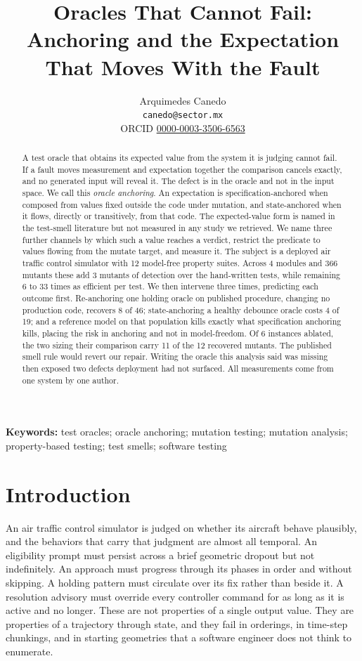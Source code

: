 \documentclass[12pt]{article}
\title{Oracles That Cannot Fail:\\
Anchoring and the Expectation That Moves With the Fault}
\author{Arquimedes Canedo\\
\texttt{canedo@sector.mx}\\
\small ORCID \href{https://orcid.org/0000-0003-3506-6563}{0000-0003-3506-6563}}
\date{}
\begin{document}
\maketitle
\vspace{-2em}

\begin{abstract}
A test oracle that obtains its expected value from the system it is judging cannot
fail. If a fault moves measurement and expectation together the comparison cancels
exactly, and no generated input will reveal it. The defect is in the oracle and
not in the input space. We call this \emph{oracle anchoring}. An expectation is specification-anchored when composed from values
fixed outside the code under mutation, and state-anchored when it flows, directly
or transitively, from that code. The expected-value form is named in the test-smell
literature but not measured in any study we retrieved. We name three further channels by which such a
value reaches a verdict, restrict the predicate to values flowing from the mutate
target, and measure it. The subject is a deployed air traffic control simulator with 12 model-free
property suites. Across 4 modules and 366
mutants these add 3 mutants of detection over the hand-written tests, while remaining 6 to 33 times as efficient per test. We then intervene
three times, predicting each outcome first. Re-anchoring one holding oracle on published
procedure, changing no production code, recovers 8 of 46; state-anchoring a healthy debounce oracle costs 4 of 19;
and a reference model on that population kills exactly what specification
anchoring kills, placing the risk in anchoring and not in model-freedom. Of 6 instances
ablated, the two sizing their comparison carry 11 of the 12 recovered mutants. The
published smell rule would revert our repair. Writing the oracle this analysis said was
missing then exposed two defects deployment had not surfaced. All measurements come from one system by one author.
\end{abstract}

\vspace{0.5em}
\noindent\textbf{Keywords:} test oracles; oracle anchoring; mutation testing;
mutation analysis; property-based testing; test smells; software testing

\section{Introduction}
\label{sec:intro}

An air traffic control simulator is judged on whether its aircraft behave
plausibly, and the behaviors that carry that judgment are almost all temporal. An
eligibility prompt must persist across a brief geometric dropout but not
indefinitely. An approach must progress through its phases in order and without
skipping. A holding pattern must circulate over its fix rather than beside it. A
resolution advisory must override every controller command for as long as it is
active and no longer. These are not properties of a single output value. They are
properties of a trajectory through state, and they fail in orderings, in
time-step chunkings, and in starting geometries that a software engineer does not think to
enumerate.
\end{document}
